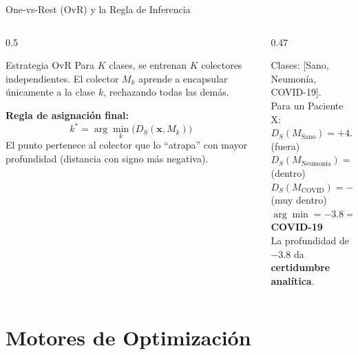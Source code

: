 \documentclass[aspectratio=169,10pt]{beamer}
\begin{document}
\begin{frame}{One-vs-Rest (OvR) y la Regla de Inferencia}
  \begin{columns}[T]
    \begin{column}{0.5\textwidth}
      \begin{block}{Estrategia OvR}
        Para $K$ clases, se entrenan $K$ colectores independientes. El colector $M_k$ aprende a encapsular únicamente a la clase $k$, rechazando todas las demás.
      \end{block}
      \vspace{6pt}
      \textbf{Regla de asignación final:}
      \[
        k^* = \arg\min_k \bigl(D_S(\mathbf{x}, M_k)\bigr)
      \]
      El punto pertenece al colector que lo ``atrapa'' con mayor profundidad (distancia con signo más negativa).
    \end{column}
    \begin{column}{0.47\textwidth}
      \begin{tcolorbox}[myex={Diagnóstico médico 3 clases}]
        {\small Clases: [Sano, Neumonía, COVID-19].\\[6pt]
        Para un Paciente X:\\
        $D_S(M_{\text{Sano}}) = +4.2$ \textcolor{accent2}{(fuera)}\\
        $D_S(M_{\text{Neumonia}}) = -0.5$ \textcolor{accent3}{(dentro)}\\
        $D_S(M_{\text{COVID}}) = -3.8$ \textcolor{accent3}{(muy dentro)}\\[6pt]
        $\arg\min = -3.8 \Rightarrow$ \textbf{COVID-19}\\[4pt]
        La profundidad de $-3.8$ da \textbf{certidumbre analítica}.}
      \end{tcolorbox}
    \end{column}
  \end{columns}
\end{frame}

\section{Motores de Optimización}
\end{document}
